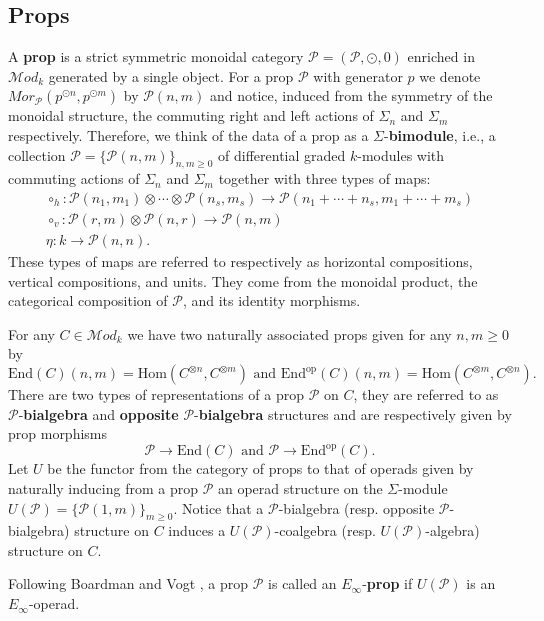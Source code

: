 \documentclass{amsart}
\newcommand{\tensor}{\otimes}
\newcommand{\Hom}{\mathrm{Hom}}
\newcommand{\End}{\mathrm{End}}
\newcommand{\Mod}{\mathcal{M}od_{k}}
\theoremstyle{definition}
\begin{document}
	\subsection{Props} A \textbf{prop} is a strict symmetric monoidal category $\mathcal{P} = (\mathcal{P}, \odot, 0)$ enriched in $\Mod$ generated by a single object. For a prop $\mathcal{P}$ with generator $p$ we denote $Mor_\mathcal{P}(p^{\odot n}, p^{\odot m})$ by $\mathcal{P}(n,m)$ and notice, induced from the symmetry of the monoidal structure, the commuting right and left actions of $\Sigma_n$ and $\Sigma_m$ respectively. Therefore, we think of the data of a prop as a $\Sigma$-\textbf{bimodule}, i.e., a collection $\mathcal{P} = \big\{\mathcal{P}(n,m)\big\}_{n,m\geq0}$ of differential graded $k$-modules with commuting actions of $\Sigma_n$ and $\Sigma_m$ together with three types of maps:
	\begin{gather*}
		\circ_h : \mathcal{P}(n_1,m_1) \tensor \cdots \tensor \mathcal{P}(n_s,m_s) \to \mathcal{P}(n_1+\cdots+n_s,m_1+\cdots+m_s) \\
		\circ_v : \mathcal{P}(r,m) \tensor \mathcal{P}(n,r) \to \mathcal{P}(n,m) \\
		\eta : k \to \mathcal{P}(n,n).
	\end{gather*}
	These types of maps are referred to respectively as horizontal compositions, vertical compositions, and units. They come from the monoidal product, the categorical composition of $\mathcal{P}$, and its identity morphisms. 
	
	For any $C\in\Mod$ we have two naturally associated props given for any $n,m\geq0$ by 
	$$\End(C)(n,m) = \Hom(C^{\tensor n},C^{\tensor m}) \text{\ \ and \ \ }\End^\mathrm{op}(C)(n,m) = \Hom(C^{\tensor m},C^{\tensor n}).$$ 
	There are two types of representations of a prop $\mathcal{P}$ on $C$, they are referred to as $\mathcal{P}$-\textbf{bialgebra} and \textbf{opposite} $\mathcal{P}$-\textbf{bialgebra} structures and are respectively given by prop morphisms 
	$$\mathcal{P}\to\End(C) \text{\ \ and \ }\mathcal{P}\to\End^\mathrm{op}(C).$$
	Let $U$ be the functor from the category of props to that of operads given by naturally inducing from a prop $\mathcal{P}$ an operad structure on the $\Sigma$-module $U(\mathcal{P})=\{\mathcal{P}(1,m)\}_{m\geq0}$. Notice that a $\mathcal{P}$-bialgebra (resp. opposite $\mathcal{P}$-bialgebra) structure on $C$ induces a $U(\mathcal{P})$-coalgebra (resp. $U(\mathcal{P})$-algebra) structure on $C$.
	
	Following Boardman and Vogt \cite{boardman2006homotopy}, a prop $\mathcal{P}$ is called an $E_\infty$-\textbf{prop} if $U(\mathcal{P})$ is an $E_\infty$-operad.
	
\end{document}
